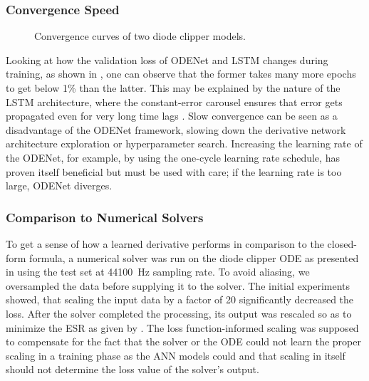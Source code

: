 \subsubsection{Convergence Speed}

\begin{figure}
    \centering
    
    \caption{Convergence curves of two diode clipper models.}
    \label{fig:diode_clipper_validation_curves}
\end{figure}

Looking at how the validation loss of ODENet and LSTM changes during training, as shown in , one can observe that the former takes many more epochs to get below 1\% than the latter. This may be explained by the nature of the \ac{LSTM} architecture, where the constant-error carousel ensures that error gets propagated even for very long time lags \cite{Hochreiter1997}. Slow convergence can be seen as a disadvantage of the ODENet framework, slowing down the derivative network architecture exploration or hyperparameter search. Increasing the learning rate of the ODENet, for example, by using the one-cycle learning rate schedule, has proven itself beneficial but must be used with care; if the learning rate is too large, ODENet diverges.

\subsubsection{Comparison to Numerical Solvers}

To get a sense of how a learned derivative performs in comparison to the closed-form formula, a numerical solver was run on the diode clipper \ac{ODE} as presented in  using the test set at \SI{44100}{Hz} sampling rate. To avoid aliasing, we oversampled the data before supplying it to the solver. The initial experiments showed, that scaling the input data by a factor of 20 significantly decreased the loss. After the solver completed the processing, its output was rescaled so as to minimize the \ac{ESR} as given by . The loss function-informed scaling was supposed to compensate for the fact that the solver or the \ac{ODE} could not learn the proper scaling in a training phase as the \ac{ANN} models could and that scaling in itself should not determine the loss value of the solver's output. 

